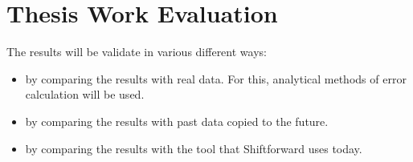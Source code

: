 \section{Thesis Work Evaluation}

The results will be validate in various different ways:
\begin{itemize}
    \item by comparing the results with real data. For this, analytical methods of error calculation will be used.
    \item by comparing the results with past data copied to the future.
    \item by comparing the results with the tool that Shiftforward uses today.
\end{itemize}

